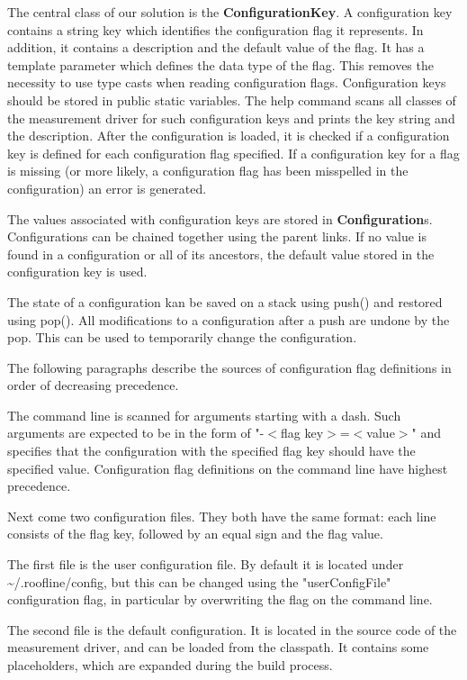 \documentclass[a4paper,12pt]{article}
\newlength{\imgwidth}
\newcommand{\umlDiagram}[1]{%
	\settowidth{\imgwidth}{\texttt{[image: out/diagrams/\#1.pdf]}}%
	\setlength{\imgwidth}{\minof{0.5\imgwidth}{\textwidth}}%
	\par\vskip0.5cm\noindent\makebox[\textwidth][c]{%
	\texttt{[image: out/diagrams/\#1.pdf]}%
}\vskip0.5cm}
\newcommand{\class}[1]{\textbf{#1}}
\newcommand{\method}[1]{\textsf{#1}}
\begin{document}
\umlDiagram{measurementDriver/Configuration}
The central class of our solution is the \class{ConfigurationKey}. A
configuration key contains a string key which identifies the configuration flag it represents. In
addition, it contains a description and the default value of the flag. It has a
template parameter which defines the data type of the flag. This removes the
necessity to use type casts when reading configuration flags. Configuration keys
should be stored in public static variables. The help command scans all classes
of the measurement driver for such configuration keys and prints the key string
and the description. After the configuration is loaded, it is checked if a
configuration key is defined for each configuration flag specified. If a
configuration key for a flag is missing (or more likely, a configuration flag
has been misspelled in the configuration) an error is generated.

The values associated with configuration keys are stored in
\class{Configuration}s. Configurations can be chained together using the parent
links. If no value is found in a configuration or all of its ancestors, the
default value stored in the configuration key is used. 

The state of a configuration kan be saved on a stack using \method{push()} and
restored using \method{pop()}. All modifications to a configuration after a push
are undone by the pop. This can be used to temporarily change the
configuration.

The following paragraphs describe the sources of configuration flag definitions
in order of decreasing precedence. 

The command line is scanned for arguments starting with a dash. Such arguments
are expected to be in the form of "-$<$flag key$>$=$<$value$>$" and specifies
that the configuration with the specified flag key should have the specified
value. Configuration flag definitions on the command line have highest
precedence.

Next come two configuration files. They both have the same format: each line
consists of the flag key, followed by an equal sign and the flag value. 

The first file is the user configuration file. By default it is located under
\textasciitilde/.roofline/config, but this can be changed using the
"userConfigFile" configuration flag, in particular by overwriting the flag on
the command line.

The second file is the default configuration. It is located in the source code
of the measurement driver, and can be loaded from the classpath. It contains
some placeholders, which are expanded during the build process.
\end{document}
